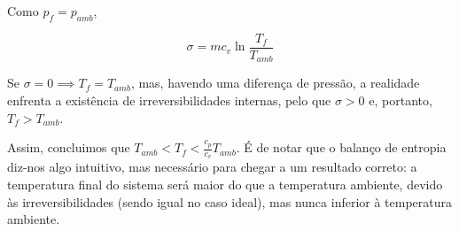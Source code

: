 \begin{examplebox}
Como $p_f = p_{amb}$,

\begin{equation}
    \sigma = m c_v \ln \frac{T_f}{T_{amb}}
\end{equation}

Se $\sigma = 0 \implies T_f = T_{amb}$, mas, havendo uma diferença de pressão, a realidade enfrenta a existência de irreversibilidades internas, pelo que $\sigma > 0$ e, portanto, $T_f > T_{amb}$.

Assim, concluimos que $T_{amb} < T_f < \frac{c_p}{c_v} T_{amb}$. É de notar que o balanço de entropia diz-nos algo intuitivo, mas necessário para chegar a um resultado correto: a temperatura final do sistema será maior do que a temperatura ambiente, devido às irreversibilidades (sendo igual no caso ideal), mas nunca inferior à temperatura ambiente.

\end{examplebox}


